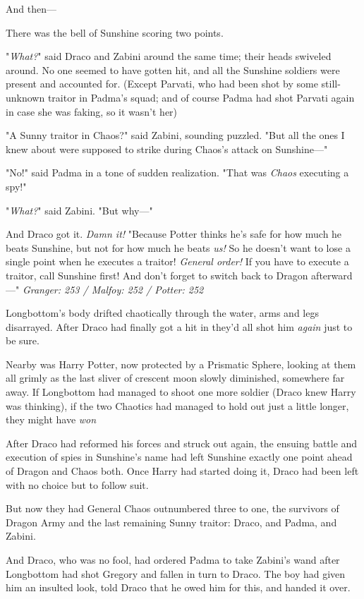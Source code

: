 And then---

There was the bell of Sunshine scoring two points.

"\emph{What?}" said Draco and Zabini around the same time; their heads swiveled
around. No one seemed to have gotten hit, and all the Sunshine soldiers were
present and accounted for. (Except Parvati, who had been shot by some
still-unknown traitor in Padma's squad; and of course Padma had shot Parvati
again in case she was faking, so it wasn't her{\el})

"A Sunny traitor in Chaos?" said Zabini, sounding puzzled. "But all the ones I
knew about were supposed to strike during Chaos's attack on Sunshine---"

"No!" said Padma in a tone of sudden realization. "That was \emph{Chaos}
executing a spy!"

"\emph{What?}" said Zabini. "But why---"

And Draco got it. \emph{Damn it!} "Because Potter thinks he's safe for how much
he beats Sunshine, but not for how much he beats \emph{us!} So he doesn't want
to lose a single point when he executes a traitor! \emph{General order!} If you
have to execute a traitor, call Sunshine first! And don't forget to switch back
to Dragon afterward---"
\sbreak
\emph{Granger: 253 / Malfoy: 252 / Potter: 252}

Longbottom's body drifted chaotically through the water, arms and legs
disarrayed. After Draco had finally got a hit in they'd all shot him
\emph{again} just to be sure.

Nearby was Harry Potter, now protected by a Prismatic Sphere, looking at them
all grimly as the last sliver of crescent moon slowly diminished, somewhere far
away. If Longbottom had managed to shoot one more soldier (Draco knew Harry was
thinking), if the two Chaotics had managed to hold out just a little longer,
they might have \emph{won}{\el}

After Draco had reformed his forces and struck out again, the ensuing battle
and execution of spies in Sunshine's name had left Sunshine exactly one point
ahead of Dragon and Chaos both. Once Harry had started doing it, Draco had been
left with no choice but to follow suit.

But now they had General Chaos outnumbered three to one, the survivors of
Dragon Army and the last remaining Sunny traitor: Draco, and Padma, and Zabini.

And Draco, who was no fool, had ordered Padma to take Zabini's wand after
Longbottom had shot Gregory and fallen in turn to Draco. The boy had given him
an insulted look, told Draco that he owed him for this, and handed it over.

